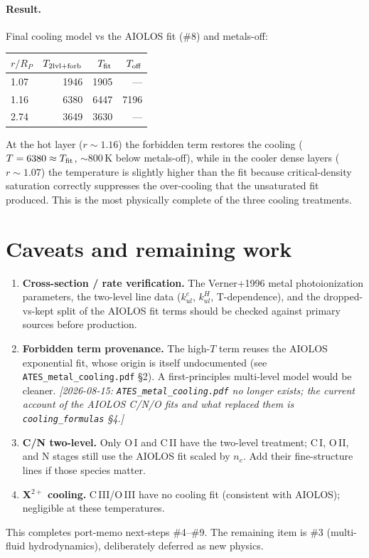 \documentclass[english,a4paper]{my_memo}
\begin{document}
\paragraph{Result.}  Final cooling model vs the AIOLOS fit (\#8) and
metals-off:
\begin{center}
\begin{tabular}{lrrr}
\toprule
$r/R_P$ & $T_{\rm 2lvl+forb}$ & $T_{\rm fit}$ & $T_{\rm off}$ \\
\midrule
1.07 & 1946 & 1905 & --- \\
1.16 & 6380 & 6447 & 7196 \\
2.74 & 3649 & 3630 & --- \\
\bottomrule
\end{tabular}
\end{center}
At the hot layer ($r\sim1.16$) the forbidden term restores the cooling
($T = 6380 \approx T_{\rm fit}$, $\sim 800$\,K below metals-off), while in
the cooler dense layers ($r\sim1.07$) the temperature is slightly higher
than the fit because critical-density saturation correctly suppresses the
over-cooling that the unsaturated fit produced. This is the most
physically complete of the three cooling treatments.

\section{Caveats and remaining work}

\begin{enumerate}
\item \textbf{Cross-section / rate verification.} The Verner+1996 metal
  photoionization parameters, the two-level line data ($k^e_{ul}$,
  $k^H_{ul}$, T-dependence), and the dropped-vs-kept split of the AIOLOS
  fit terms should be checked against primary sources before production.
\item \textbf{Forbidden term provenance.} The high-$T$ term reuses the
  AIOLOS exponential fit, whose origin is itself undocumented (see
  \texttt{ATES\_metal\_cooling.pdf} \S2). A first-principles multi-level
  model would be cleaner.
  \emph{[2026-08-15: \texttt{ATES\_metal\_cooling.pdf} no longer exists;
  the current account of the AIOLOS C/N/O fits and what replaced them is
  \texttt{cooling\_formulas} \S4.]}
\item \textbf{C/N two-level.} Only O\,I and C\,II have the two-level
  treatment; C\,I, O\,II, and N stages still use the AIOLOS fit scaled by
  $n_e$.  Add their fine-structure lines if those species matter.
\item \textbf{X$^{2+}$ cooling.} C\,III/O\,III have no cooling fit
  (consistent with AIOLOS); negligible at these temperatures.
\end{enumerate}

This completes port-memo next-steps \#4--\#9. The remaining item is
\#3 (multi-fluid hydrodynamics), deliberately deferred as new physics.
\end{document}
